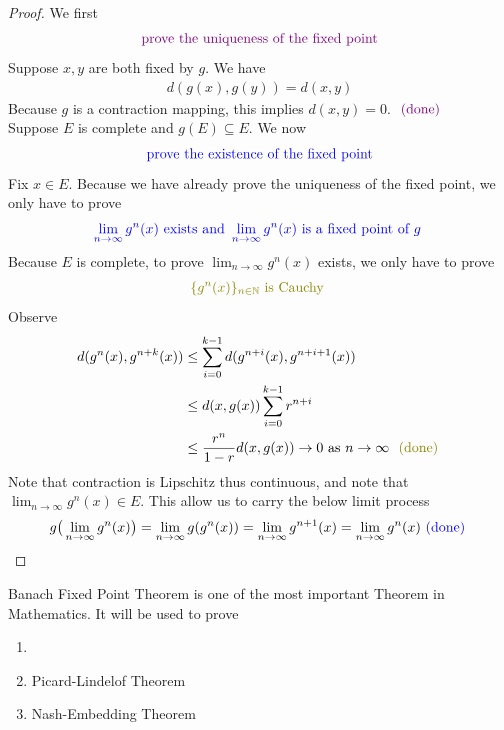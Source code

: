\documentclass{report}
\begin{document}
\begin{proof}
We first 
\begin{align*}
\textcolor{violet}{\text{ prove the uniqueness of the fixed point }}
\end{align*}
Suppose $x,y$ are both fixed by $g$.  We have
\begin{align*}
d(g(x),g(y))=d(x,y)
\end{align*}
Because  $g$ is a contraction mapping,  this implies $d(x,y)=0$. $\textcolor{violet}{\text{ (done) }}$ \\

Suppose $E$ is complete and $g(E)\subseteq E$. We now 
\begin{align*}
\textcolor{blue}{\text{ prove the existence of the fixed point }}
\end{align*}
Fix $x \in E$. Because we have already prove the uniqueness of the fixed point, we only have to prove 
\begin{align*}
\textcolor{blue}{\lim_{n\to \infty}g^n(x)\text{ exists and }\lim_{n\to \infty}g^n(x)\text{ is a fixed point of $g$ }}
\end{align*}
Because $E$ is complete, to prove $\lim_{n\to \infty}g^n(x)$ exists, we only have to prove
\begin{align*}
\olive{\set{g^n(x)}_{n\inn}\text{ is Cauchy }}
\end{align*}
Observe 
\begin{align*}
  d(g^n(x),g^{n+k}(x))&\leq \sum_{i=0}^{k-1}d(g^{n+i}(x),g^{n+i+1}(x))\\
  &\leq d(x,g(x))\sum_{i=0}^{k-1}r^{n+i}\\
  &\leq \frac{r^n}{1-r}d(x,g(x))\to 0\text{ as $n\to \infty$ }\odone
\end{align*}
Note that contraction is Lipschitz thus continuous, and note that $\lim_{n\to \infty}g^n(x) \in E$. This allow us to carry the below limit process 
\begin{align*}
  g\big(\lim_{n\to \infty}g^n(x)\big)=\lim_{n\to \infty}g(g^n(x))=\lim_{n\to \infty}g^{n+1}(x)=\lim_{n\to \infty}g^n(x)\textcolor{blue}{\text{ (done) }}
\end{align*}
\end{proof}
\begin{mdframed}
Banach Fixed Point Theorem is one of the most important Theorem in Mathematics. It will be used to prove 
\begin{enumerate}[label=(\alph*)]
  \item {} 
  \item Picard-Lindelof Theorem  
  \item Nash-Embedding Theorem
\end{enumerate}
\end{mdframed}
\end{document}

